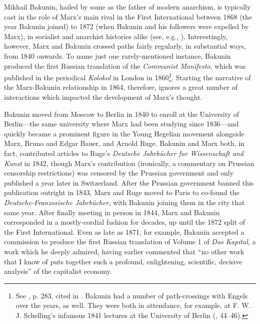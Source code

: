 Mikhail Bakunin, hailed by some as the father of modern anarchism, is typically cast in the role of Marx's main rival in the First International between 1868 (the year Bakunin joined) to 1872 (when Bakunin and his followers were expelled by Marx), in socialist and anarchist histories alike (see, e.g., \cite{eckhardt_first_2016}). Interestingly, however, Marx and Bakunin crossed paths fairly regularly, in substantial ways, from 1840 onwards. To name just one rarely-mentioned instance, Bakunin produced the first Russian translation of the \textit{Communist Manifesto}, which was published in the periodical \textit{Kolokol} in London in 1860\footnote{See \cite{guillaume_internationale_1905}, p. 283, cited in \cite{favilli_history_1996}. Bakunin had a number of path-crossings with Engels over the years, as well. They were both in attendance, for example, at F. W. J. Schelling's infamous 1841 lectures at the University of Berlin (\cite{hunt_marxs_2010}, 44--46).}. Starting the narrative of the Marx-Bakunin relationship in 1864, therefore, ignores a great number of interactions which impacted the development of Marx's thought.

Bakunin moved from Moscow to Berlin in 1840 to enroll at the University of Berlin---the same university where Marx had been studying since 1836---and quickly became a prominent figure in the Young Hegelian movement alongside Marx, Bruno and Edgar Bauer, and Arnold Ruge. Bakunin and Marx both, in fact, contributed articles to Ruge's \textit{Deutsche Jahrbücher fur Wissenschaft and Kunst} in 1842, though Marx's contribution (ironically, a commentary on Prussian censorship restrictions) was censored by the Prussian government and only published a year later in Switzerland. After the Prussian government banned this publication outright in 1843, Marx and Ruge moved to Paris to co-found the \textit{Deutsche-Franzosische Jahrbücher}, with Bakunin joining them in the city that same year. After finally meeting in person in 1844, Marx and Bakunin corresponded in a mostly-cordial fashion for decades, up until the 1872 split of the First International. Even as late as 1871, for example, Bakunin accepted a commission to produce the first Russian translation of Volume 1 of \textit{Das Kapital}, a work which he deeply admired, having earlier commented that ``no other work that I know of puts together such a profound, enlightening, scientific, decisive analysis'' of the capitalist economy.

